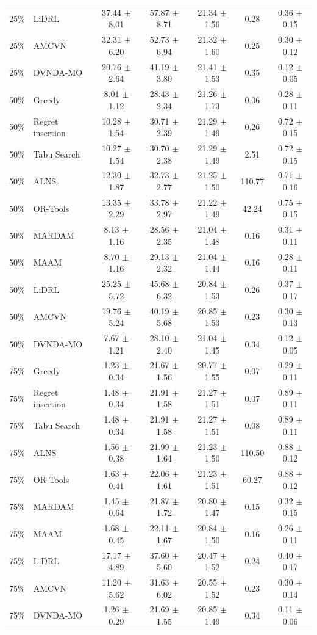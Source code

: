 \begin{tabular}{clccccc}
25\% & LiDRL & 37.44 $\pm$ 8.01 & 57.87 $\pm$ 8.71 & 21.34 $\pm$ 1.56 & 0.28 & 0.36 $\pm$ 0.15 \\
25\% & AMCVN & 32.31 $\pm$ 6.20 & 52.73 $\pm$ 6.94 & 21.32 $\pm$ 1.60 & 0.25 & 0.30 $\pm$ 0.12 \\
25\% & DVNDA-MO & 20.76 $\pm$ 2.64 & 41.19 $\pm$ 3.80 & 21.41 $\pm$ 1.53 & 0.35 & 0.12 $\pm$ 0.05 \\
50\% & Greedy & 8.01 $\pm$ 1.12 & 28.43 $\pm$ 2.34 & 21.26 $\pm$ 1.73 & 0.06 & 0.28 $\pm$ 0.11 \\
50\% & Regret insertion & 10.28 $\pm$ 1.54 & 30.71 $\pm$ 2.39 & 21.29 $\pm$ 1.49 & 0.26 & 0.72 $\pm$ 0.15 \\
50\% & Tabu Search & 10.27 $\pm$ 1.54 & 30.70 $\pm$ 2.38 & 21.29 $\pm$ 1.49 & 2.51 & 0.72 $\pm$ 0.15 \\
50\% & ALNS & 12.30 $\pm$ 1.87 & 32.73 $\pm$ 2.77 & 21.25 $\pm$ 1.50 & 110.77 & 0.71 $\pm$ 0.16 \\
50\% & OR-Tools & 13.35 $\pm$ 2.29 & 33.78 $\pm$ 2.97 & 21.22 $\pm$ 1.49 & 42.24 & 0.75 $\pm$ 0.15 \\
50\% & MARDAM & 8.13 $\pm$ 1.16 & 28.56 $\pm$ 2.35 & 21.04 $\pm$ 1.48 & 0.16 & 0.31 $\pm$ 0.11 \\
50\% & MAAM & 8.70 $\pm$ 1.16 & 29.13 $\pm$ 2.32 & 21.04 $\pm$ 1.44 & 0.16 & 0.28 $\pm$ 0.11 \\
50\% & LiDRL & 25.25 $\pm$ 5.72 & 45.68 $\pm$ 6.32 & 20.84 $\pm$ 1.53 & 0.26 & 0.37 $\pm$ 0.17 \\
50\% & AMCVN & 19.76 $\pm$ 5.24 & 40.19 $\pm$ 5.68 & 20.85 $\pm$ 1.53 & 0.23 & 0.30 $\pm$ 0.13 \\
50\% & DVNDA-MO & 7.67 $\pm$ 1.21 & 28.10 $\pm$ 2.40 & 21.04 $\pm$ 1.45 & 0.34 & 0.12 $\pm$ 0.05 \\
75\% & Greedy & 1.23 $\pm$ 0.34 & 21.67 $\pm$ 1.56 & 20.77 $\pm$ 1.55 & 0.07 & 0.29 $\pm$ 0.11 \\
75\% & Regret insertion & 1.48 $\pm$ 0.34 & 21.91 $\pm$ 1.58 & 21.27 $\pm$ 1.51 & 0.07 & 0.89 $\pm$ 0.11 \\
75\% & Tabu Search & 1.48 $\pm$ 0.34 & 21.91 $\pm$ 1.58 & 21.27 $\pm$ 1.51 & 0.08 & 0.89 $\pm$ 0.11 \\
75\% & ALNS & 1.56 $\pm$ 0.38 & 21.99 $\pm$ 1.64 & 21.23 $\pm$ 1.50 & 110.50 & 0.88 $\pm$ 0.12 \\
75\% & OR-Tools & 1.63 $\pm$ 0.41 & 22.06 $\pm$ 1.61 & 21.23 $\pm$ 1.51 & 60.27 & 0.88 $\pm$ 0.12 \\
75\% & MARDAM & 1.45 $\pm$ 0.64 & 21.87 $\pm$ 1.72 & 20.80 $\pm$ 1.47 & 0.15 & 0.32 $\pm$ 0.15 \\
75\% & MAAM & 1.68 $\pm$ 0.45 & 22.11 $\pm$ 1.67 & 20.84 $\pm$ 1.50 & 0.16 & 0.26 $\pm$ 0.11 \\
75\% & LiDRL & 17.17 $\pm$ 4.89 & 37.60 $\pm$ 5.60 & 20.47 $\pm$ 1.52 & 0.24 & 0.40 $\pm$ 0.17 \\
75\% & AMCVN & 11.20 $\pm$ 5.62 & 31.63 $\pm$ 6.02 & 20.55 $\pm$ 1.52 & 0.23 & 0.30 $\pm$ 0.14 \\
75\% & DVNDA-MO & 1.26 $\pm$ 0.29 & 21.69 $\pm$ 1.55 & 20.85 $\pm$ 1.49 & 0.34 & 0.11 $\pm$ 0.06 \\
\bottomrule
\end{tabular}
